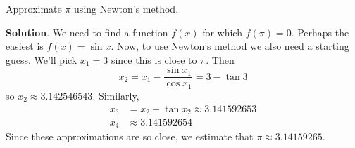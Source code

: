 \documentclass[10pt,]{book}
\theoremstyle{ptxplainnotitle}
\theoremstyle{ptxplaintitle}
\theoremstyle{ptxplainnotitle}
\theoremstyle{ptxplaintitle}
\theoremstyle{ptxplainnotitle}
\theoremstyle{ptxplaintitle}
\theoremstyle{ptxdefinitionnotitle}
\theoremstyle{ptxdefinitiontitle}
\theoremstyle{ptxdefinitionnotitle}
\theoremstyle{ptxdefinitiontitle}
\theoremstyle{ptxdefinitionnotitle}
\theoremstyle{ptxdefinitiontitle}
\theoremstyle{ptxdefinitionnotitle}
\theoremstyle{ptxdefinitiontitle}
\theoremstyle{ptxdefinitionnotitle}
\theoremstyle{ptxdefinitiontitle}
\numberwithin{equation}{section}
\begin{document}
\begin{example}[{Approximating \(\pi\).}]\label{example-approximating-pi}
\hypertarget{p-371}{}%
Approximate \(\pi\) using Newton's method.%
\par\smallskip%
\noindent\textbf{Solution}.\hypertarget{solution-82}{}\quad%
\hypertarget{p-372}{}%
We need to find a function \(f(x)\) for which \(f(\pi) = 0\). Perhaps the easiest is \(f(x) = \sin x\). Now, to use Newton's method we also need a starting guess. We'll pick \(x_{1} = 3\) since this is close to \(\pi\). Then%
\begin{equation*}
x_{2} = x_{1} - \frac{\sin x_{1}}{\cos x_{1}} = 3 - \tan 3
\end{equation*}
so \(x_{2} \approx 3.142546543\). Similarly,%
\begin{align*}
x_{3} & = x_{2} - \tan x_{2} \approx 3.141592653 \\
x_{4} & \approx 3.141592654 
\end{align*}
Since these approximations are so close, we estimate that \(\pi\approx 3.14159265\).%
\end{example}
\end{document}
